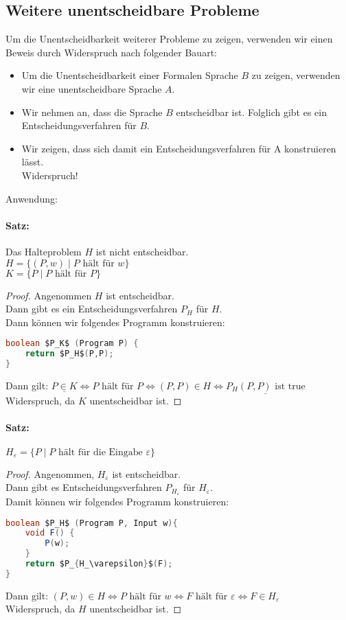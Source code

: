 \subsection{Weitere unentscheidbare Probleme}
Um die Unentscheidbarkeit weiterer Probleme zu zeigen, verwenden wir einen Beweis durch Widerspruch nach folgender Bauart:
\begin{itemize}
\item Um die Unentscheidbarkeit einer Formalen Sprache $B$ zu zeigen, verwenden wir eine unentscheidbare Sprache $A$.
\item Wir nehmen an, dass die Sprache $B$ entscheidbar ist. Folglich gibt es ein Entscheidungsverfahren für $B$.
\item Wir zeigen, dass sich damit ein Entscheidungsverfahren für A konstruieren lässt.\\
Widerspruch!
\end{itemize}

Anwendung:
\paragraph{Satz:} Das Halteproblem $H$ ist nicht entscheidbar.\\
$H=\{(P,w)\;|\; P \text{ hält für }w \}$\\
$K=\{P\;|\;P \text{ hält für } P\}$
\begin{proof}
Angenommen $H$ ist entscheidbar. \\
Dann gibt es ein Entscheidungsverfahren $P_H$ für $H$. \\
Dann können wir folgendes Programm konstruieren:
\begin{lstlisting}[language=Java]
boolean $P_K$ (Program P) {
	return $P_H$(P,P);
}
\end{lstlisting}
Dann gilt: $\underline{P\in K} \Leftrightarrow P \text{ hält für } P \Leftrightarrow (P,P) \in H \Leftrightarrow \underline{P_H(P,P) \text{ ist true}}$\\
Widerspruch, da $K$ unentscheidbar ist.
\end{proof}
\paragraph{Satz:} $H_\varepsilon = \{P \;|\; P \text{ hält für die Eingabe }\varepsilon\}$
\begin{proof}
Angenommen, $H_\varepsilon$ ist entscheidbar.\\
Dann gibt es Entscheidungsverfahren $P_{H_\varepsilon}$ für $H_\varepsilon$.\\
Damit können wir folgendes Programm konstruieren:
\begin{lstlisting}[language=Java]
boolean $P_H$ (Program P, Input w){
	void F() {
		P(w);
	}
	return $P_{H_\varepsilon}$(F);
}
\end{lstlisting}
Dann gilt: $(P,w) \in H \Leftrightarrow P \text{ hält für }w \Leftrightarrow F \text{ hält für }\varepsilon \Leftrightarrow F \in H_\varepsilon$\\
Widerspruch, da $H$ unentscheidbar ist.
\end{proof}
